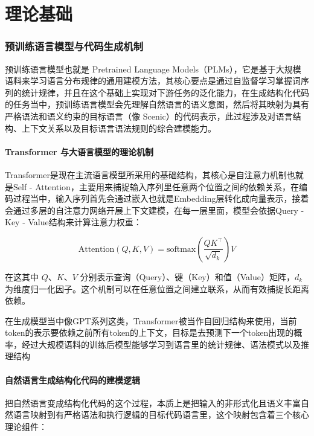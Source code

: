 \chapter{理论基础}

\subsection{预训练语言模型与代码生成机制}

预训练语言模型也就是 Pretrained Language Models（PLMs），它是基于大规模语料来学习语言分布规律的通用建模方法，其核心要点是通过自监督学习掌握词序列的统计规律，并且在这个基础上实现对下游任务的泛化能力，在生成结构化代码的任务当中，预训练语言模型会先理解自然语言的语义意图，然后将其映射为具有严格语法和语义约束的目标语言（像 Scenic）的代码表示，此过程涉及对语言结构、上下文关系以及目标语言语法规则的综合建模能力。

\subsubsection{Transformer 与大语言模型的理论机制}

Transformer是现在主流语言模型所采用的基础结构，其核心是自注意力机制也就是Self - Attention，主要用来捕捉输入序列里任意两个位置之间的依赖关系，在编码过程当中，输入序列首先会通过嵌入也就是Embedding层转化成向量表示，接着会通过多层的自注意力网络开展上下文建模，在每一层里面，模型会依据Query - Key - Value结构来计算注意力权重：

\begin{equation}
	\text{Attention}(Q, K, V) = \text{softmax}\left( \frac{QK^\top}{\sqrt{d_k}} \right)V
\end{equation}

在这其中 $Q$、$K$、$V$ 分别表示查询（Query）、键（Key）和值（Value）矩阵，$d_k$ 为维度归一化因子。这个机制可以在任意位置之间建立联系，从而有效捕捉长距离依赖。

在生成模型当中像GPT系列这类，Transformer被当作自回归结构来使用，当前token的表示要依赖之前所有token的上下文，目标是去预测下一个token出现的概率，经过大规模语料的训练后模型能够学习到语言里的统计规律、语法模式以及推理结构

\subsubsection{自然语言生成结构化代码的建模逻辑}

把自然语言变成结构化代码的这个过程，本质上是把输入的非形式化且语义丰富自然语言映射到有严格语法和执行逻辑的目标代码语言里，这个映射包含着三个核心理论组件：


